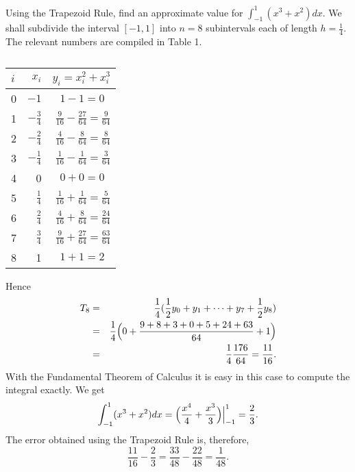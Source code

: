\begin{example} Using the Trapezoid Rule, find an approximate value for $\int_{-1}^1 (x^3 + x^2) dx$. We shall subdivide the interval $[-1, 1]$ into $n = 8$ subintervals each of length $h = \frac{1}{4}$. The relevant numbers are compiled in Table 1.

\begin{table}\label{table 8.1}
\centering
\begin{tabular}{l|r|r} \hline
$i$  & $x_i$           &$y_i = x_i^2 + x_i^3$  \vspace {1ex}\\ \hline
0     &$-1$             &$1 - 1 = 0\;\;$  \\
1     &$-\frac{3}{4}$&$\frac{9}{16} - \frac{27}{64} =  \frac{9}{64}$ \\
2     &$-\frac{2}{4}$&$\frac{4}{16} - \frac{8}{64}   =  \frac{8}{64}$ \\
3     &$-\frac{1}{4}$&$\frac{1}{16} - \frac{1}{64}   =  \frac{3}{64}$ \\
4     &  0             &$0 + 0 = 0\;\;$    \\
5     &$\frac{1}{4}$  &$\frac{1}{16} + \frac{1}{64}   =  \frac{5}{64}$  \\
6     &$\frac{2}{4}$  &$\frac{4}{16} + \frac{8}{64}   =  \frac{24}{64}$ \\
7     &$\frac{3}{4}$  &$\frac{9}{16} + \frac{27}{64} =  \frac{63}{64}$ \\
8     &   1             &$1 + 1 = 2\;\;$      \\ \hline
\end{tabular}
\caption{}
\end{table}

\noindent Hence 
\begin{eqnarray*}
T_8 
&=& \frac{1}{4} (\frac{1}{2}y_0 + y_1 + \cdots + y_7 + \frac{1}{2}y_8)\\ &=& \frac{1}{4} \Bigl( 0 + \frac{9+8+3+0+5+24+63}{64} + 1 \Bigr)\\
&=& \frac{1}{4} \frac{176}{64} = \frac{11}{16}.
\end{eqnarray*}
\noindent With the Fundamental Theorem of Calculus it is easy in this case to compute the integral exactly. We get
$$
\int_{-1}^1 (x^3 + x^2)dx = \Bigl( \frac{x^4}{4} + \frac{x^3}{3} \Bigr) \Big|_{-1}^1 = \frac{2}{3}.
$$
\noindent The error obtained using the Trapezoid Rule is, therefore,
$$
\frac{11}{16} - \frac{2}{3} = \frac{33}{48} - \frac{22}{48} = \frac{1}{48}.
$$
\end{example}

